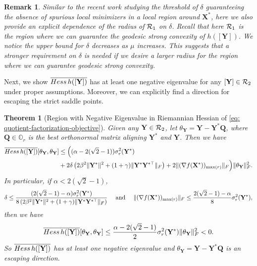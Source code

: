 \documentclass[11pt]{article}
\newtheorem{Theorem}{Theorem}
\newtheorem{Remark}{Remark}
\newcommand{\0}{{\mathbf{0}}}
\newcommand{\1}{{\mathbf{1}}}
\newcommand{\X}{{\mathbf{X}}}
\newcommand{\Q}{{\mathbf{Q}}}
\newcommand{\Y}{{\mathbf{Y}}}
\newcommand{\cR}{{\cal R}}
\newcommand{\Hess}{{\rm Hess}}
\newcommand{\F}{{\rm F}}
\newcommand{\bbO}{\mathbb{O}}
\newcommand{\nc}{\normalcolor}
\begin{document}
\begin{Remark}
	Similar to the recent work \cite{zhang2020many} studying the threshold of $\delta$ guaranteeing the absence of spurious local minimizers in a local region around $\X^*$, here we also provide an explicit dependence of the radius of $\cR_1$ on $\delta$. Recall that here $\cR_1$ is the region where we can guarantee the geodesic strong convexity of $h([\Y])$. We notice the upper bound for $\delta$ decreases as $\mu$ increases. This suggests that a stronger requirement on $\delta$ is needed if we desire a larger radius for the region where we can guarantee geodesic strong convexity.
\end{Remark}

Next, we show $ \overline{\Hess\, h([\Y])}$ has at least one negative eigenvalue for any $[\Y] \in \cR_2$ under proper assumptions. Moreover, we can explicitly find a direction for escaping the strict saddle points.
\begin{Theorem}[Region with Negative Eigenvalue in Riemannian Hessian of \eqref{eq: quotient-factorization-objective}] \label{th: h-negative-eigenvalue-region}   Given any $\Y \in \cR_2$, let $\theta_\Y = \Y - \Y^* \Q $, where $\Q \in \bbO_r$ is the best orthonormal \nc matrix aligning $\Y^*$ and $\Y$. Then we have
\begin{equation*}
\begin{split}
	\overline{\Hess\, h([\Y])}[\theta_\Y, \theta_\Y] & \leq \Big( (\alpha - 2 ( \sqrt{2} - 1 ))  \sigma^2_r(\Y^*)  \\
	 & +    2 \delta \left( 2 \beta^2 \|\Y^*\|^2 + (1+\gamma) \| \Y^* \Y^{*\top} \|_\F  \right) +  2 \| ( \nabla f(\X^*) )_{\max(r)} \|_\F  \Big) \|\theta_\Y\|_\F^2.
\end{split}
\end{equation*}
In particular, if $\alpha < 2(\sqrt{2} - 1)$, %
 \begin{equation*}
	\delta \leq \frac{( 2 (\sqrt{2} -1) -\alpha ) \sigma^2_r(\Y^*)  }{8 \left( 2 \beta^2 \|\Y^*\|^2 + (1 + \gamma ) \| \Y^* \Y^{*\top} \|_\F   \right) } \quad \text{ and } \quad \| ( \nabla f(\X^*) )_{\max(r)} \|_\F \leq \frac{ 2 ( \sqrt{2} - 1 ) - \alpha }{8} \sigma^2_r(\Y^*),
\end{equation*} then we have
\begin{equation*}
	 \overline{\Hess\, h([\Y])}[\theta_\Y, \theta_\Y]  \leq  \frac{\alpha - 2 ( \sqrt{2} - 1 )}{2}  \sigma^2_r(\Y^*) \|\theta_\Y\|_\F^2 < 0.
\end{equation*}
So $\overline{ \Hess\, h([\Y])}$ has at least one negative eigenvalue and $\theta_\Y = \Y - \Y^* \Q$ is an escaping direction.
\end{Theorem}
\end{document}
